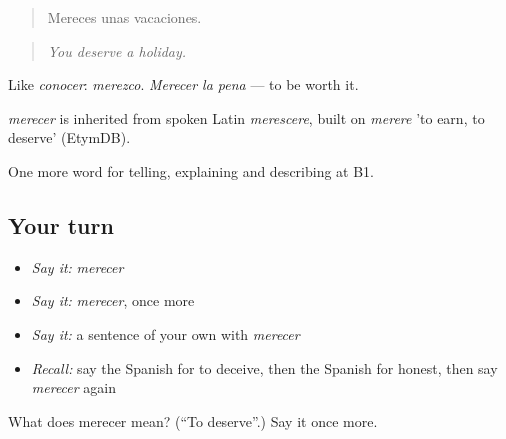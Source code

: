 \begin{quote}
Mereces unas vacaciones.
\end{quote}

\begin{quote}
\emph{You deserve a holiday.}
\end{quote}

Like \emph{conocer}: \emph{merezco}. \emph{Merecer la pena} — to be worth it.

\begin{cousinweb}
\emph{merecer} is inherited from spoken Latin \emph{merescere}, built on \emph{merere} 'to earn, to deserve' (EtymDB).
\end{cousinweb}

\begin{grammarlens}[title={What you've built}]
One more word for telling, explaining and describing at B1.
\end{grammarlens}

\subsection*{Your turn}
\begin{itemize}
\raggedright
  \item \emph{Say it:} \emph{merecer}
  \item \emph{Say it:} \emph{merecer}, once more
  \item \emph{Say it:} a sentence of your own with \emph{merecer}
  \item \emph{Recall:} say the Spanish for to deceive, then the Spanish for honest, then say \emph{merecer} again
\end{itemize}

\begin{tcolorbox}[breakable,colback=teal!4,colframe=teal!35!black,title={Before you move on}]
What does merecer mean? (\textquotedblleft{}To deserve\textquotedblright{}.) Say it once more.
\end{tcolorbox}
